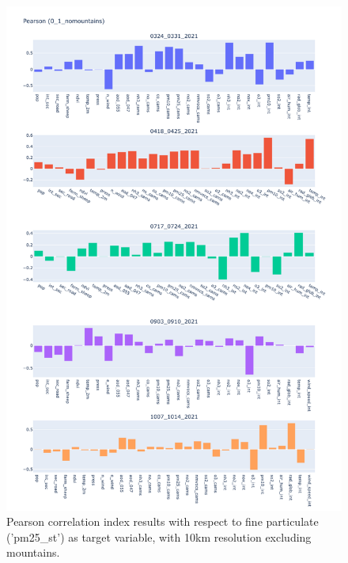 \begin{figure}[H]
    \centering
    \includegraphics[scale=0.35]{images/tests/0_1_nomountainspm25_st_pearson.png}
    \caption{Pearson correlation index results with respect to fine particulate ('pm25\_st') as target variable, with 10km resolution excluding mountains.}
    \label{fig:overview}
\end{figure}
